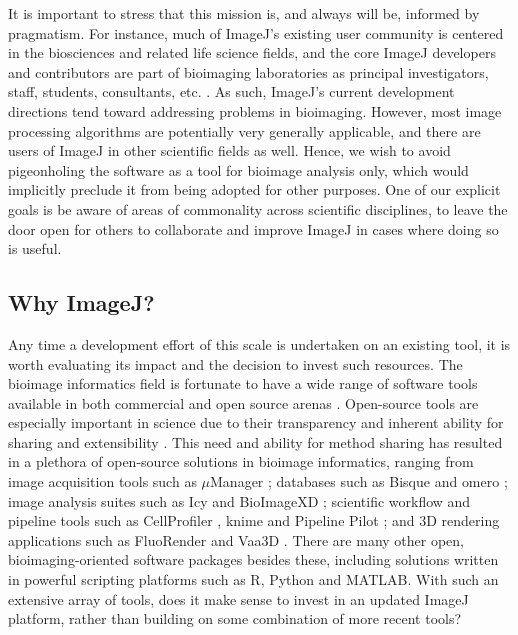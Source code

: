 \documentclass{bmcart}
\begin{document}
It is important to stress that this mission is, and always will be, informed
by pragmatism. For instance, much of ImageJ's existing user community is
centered in the biosciences and related life science fields, and the core
ImageJ developers and contributors are part of bioimaging laboratories as
principal investigators, staff, students, consultants, etc.
\cite{imagej_contributors}. As such, ImageJ's current development directions
tend toward addressing problems in bioimaging. However, most image processing
algorithms are potentially very generally applicable, and there are users of
ImageJ in other scientific fields as well. Hence, we wish to avoid
pigeonholing the software as a tool for bioimage analysis only, which would
implicitly preclude it from being adopted for other purposes. One of our
explicit goals is be aware of areas of commonality across scientific
disciplines, to leave the door open for others to collaborate and improve
ImageJ in cases where doing so is useful.

\subsection*{Why ImageJ?}
Any time a development effort of this scale is undertaken on an existing tool,
it is worth evaluating its impact and the decision to invest such resources.
The bioimage informatics field \cite{bioimage_informatics} is fortunate to have
a wide range of software tools available in both commercial and open source
arenas \cite{bioimaging_software_review}. Open-source tools are especially
important in science due to their transparency and inherent ability for sharing
and extensibility \cite{bioimaging_cell_biology}. This need and ability for
method sharing has resulted in a plethora of open-source solutions in bioimage
informatics, ranging from image acquisition tools such as $\mu$Manager
\cite{micro_manager_2010, micro_manager_2014}; databases such as Bisque
\cite{bisque} and \acrfull{omero} \cite{omero}; image analysis suites such as
Icy \cite{icy} and BioImageXD \cite{bioimagexd}; scientific workflow and
pipeline tools such as CellProfiler \cite{cellprofiler, cellprofiler_2011},
\acrfull{knime} \cite{knime, knip} and Pipeline Pilot \cite{workflow_systems};
and 3D rendering applications such as FluoRender \cite{fluorender} and Vaa3D
\cite{vaa3d}. There are many other open, bioimaging-oriented software packages
besides these, including solutions written in powerful scripting platforms such
as R, Python and MATLAB. With such an extensive array of tools, does it make
sense to invest in an updated ImageJ platform, rather than building on some
combination of more recent tools?
\end{document}
